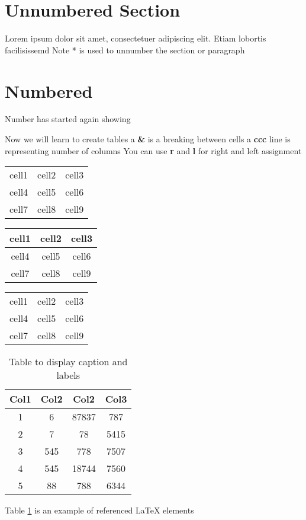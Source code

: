 \documentclass[14pt, letterpaper]{book}
\begin{document}
\section*{Unnumbered Section}
Lorem ipsum dolor sit amet, consectetuer adipiscing elit.  
Etiam lobortis facilisissemd
Note * is used to unnumber the section or paragraph

\section{Numbered}
Number has started again showing

Now we will learn to create tables
a \textbf{\&} is a breaking between cells
a \textbf{ccc} line is representing number of columns
You can use \textbf{r} and \textbf{l} for right and left assignment
\begin{center}
  \begin{tabular}{c c c}
    cell1 & cell2 & cell3 \\
    cell4 & cell5 & cell6 \\
    cell7 & cell8 & cell9 \\
  \end{tabular}
\end{center}
\begin{center}
  \begin{tabular}{c |c| c}
    cell1 & cell2 & cell3 \\
    \hline
    cell4 & cell5 & cell6 \\
    \hline
    cell7 & cell8 & cell9 \\
  \end{tabular}
\end{center}
\begin{center}
  \begin{tabular}{|c| c| c|}
    \hline
    cell1 & cell2 & cell3 \\
    cell4 & cell5 & cell6 \\
    cell7 & cell8 & cell9 \\
    \hline
  \end{tabular}
\end{center}



\begin{table}[h!]
 \begin{tabular}{||c c c c||} 
 \hline
 Col1 & Col2 & Col2 & Col3 \\ [0.5ex] 
 \hline\hline
 1 & 6 & 87837 & 787 \\ 
 \hline
 2 & 7 & 78 & 5415 \\
 \hline
 3 & 545 & 778 & 7507 \\
 \hline
 4 & 545 & 18744 & 7560 \\
 \hline
 5 & 88 & 788 & 6344 \\ [1ex] 
 \hline
 \end{tabular}
 \caption{Table to display caption and labels}
 \label{table:data}
\end{table}

Table \ref{table:data} is an example of referenced \LaTeX{} elements
\end{document}
